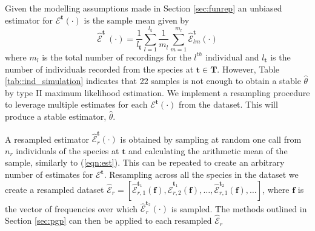 \documentclass{ws-rv9x6}
\begin{document}
Given the modelling assumptions made in Section \ref{sec:funrep} an unbiased estimator for \(\mathcal{E}^{\mathbf{t}}(\cdot)\) is the sample mean given by 
\begin{equation}
\hat{\mathcal{E}}^{\mathbf{t}}~(\cdot) = \frac{1}{l_{\mathbf{t}}} \sum_{l = 1}^{l_{\mathbf{t}}} \frac{1}{m_l} \sum_{m = 1}^{m_l} \hat{\mathcal{E}}_{lm}^{\mathbf{t}}(\cdot)
\label{eqn:est}
\end{equation}
where \(m_l\) is the total number of recordings for the \(l^{th}\) individual and \(l_{\mathbf{t}}\) is the number of individuals recorded from the species at \(\mathbf{t} \in \mathbf{T}\). However, Table \ref{tab::ind_simulation} indicates that 22 samples is not enough to obtain a stable \(\hat{\theta}\) by type II maximum likelihood estimation. We implement a resampling procedure to leverage multiple estimates for each \(\mathcal{E}^{\mathbf{t}}(\cdot)\) from the dataset. This will produce a stable estimator, \(\hat{\theta}\).

A resampled estimator \(\hat{\mathcal{E}}_r^{\mathbf{t}}(\cdot)\) is obtained by sampling at random one call from \(n_r\) individuals of the species at \(\mathbf{t}\) and calculating the arithmetic mean of the sample, similarly to (\ref{eqn:est}). This can be repeated to create an arbitrary number of estimates for \(\mathcal{E}^{\mathbf{t}}\). Resampling across all the species in the dataset we create a resampled dataset \(\hat{\mathcal{E}}_r = [\hat{\mathcal{E}}_{r,1}^{\mathbf{t}_1}(\mathbf
f), \hat{\mathcal{E}}_{r,2}^{\mathbf{t}_1}(\mathbf
f), \dots, \hat{\mathcal{E}}_{r,1}^{\mathbf{t}_2}(\mathbf
f), \dots]\), where \(\mathbf{f}\) is the vector of frequencies over which \(\hat{\mathcal{E}}_{r}^{\mathbf{t}_2}(
\cdot)\) is sampled. The methods outlined in Section \ref{sec:pgp} can then be applied to each resampled \(\hat{\mathcal{E}}_r\)
\end{document}
